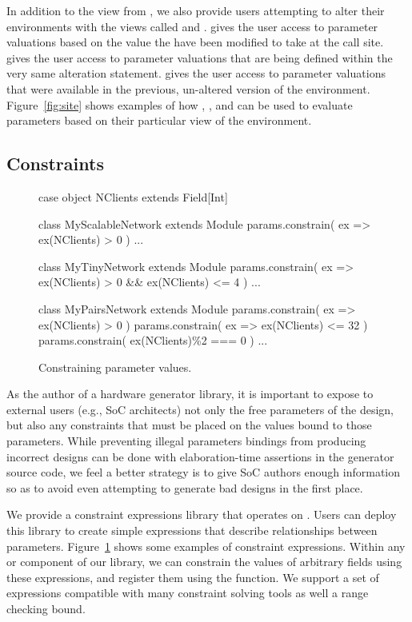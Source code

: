 In addition to the view from , we also provide users attempting to alter their environments with the views called  and .
 gives the user access to parameter valuations based on the value the have been modified to take at the call site.
 gives the user access to parameter valuations that are being defined within the very same alteration statement.
 gives the user access to parameter valuations that were available in the previous, un-altered version of the environment.
Figure~\ref{fig:site} shows examples of how , , and  can be used to evaluate parameters based on their particular view of the environment.

\subsection{Constraints}

\begin{figure}
\centering
\begin{scala}
case object NClients extends Field[Int]

class MyScalableNetwork extends Module {
  params.constrain( ex => ex(NClients) >  0 ) 
  ...
} 

class MyTinyNetwork extends Module {
  params.constrain( ex => ex(NClients) > 0 && ex(NClients) <= 4 )
  ...
} 

class MyPairsNetwork extends Module {
  params.constrain( ex => ex(NClients) > 0 ) 
  params.constrain( ex => ex(NClients) <= 32 )
  params.constrain( ex(NClients)\%2 === 0 )
  ...
} 
\end{scala} 
\caption{Constraining parameter values. }
\label{fig:constraints}
\end{figure}

As the author of a hardware generator library, it is important to expose to external users (e.g., SoC architects)
not only the free parameters of the design, but also any constraints that must be placed on
the values bound to those parameters. 
While preventing illegal parameters bindings from producing incorrect designs can be done with elaboration-time assertions
in the generator source code, we feel a better strategy is to give SoC authors enough information
so as to avoid even attempting to generate bad designs in the first place.

We provide a constraint expressions library that operates on .
Users can deploy this library to create simple expressions that describe relationships between parameters.
Figure~\ref{fig:constraints} shows some examples of constraint expressions.
Within any  or  component of our library, we can constrain the values of arbitrary fields using these expressions,
and register them using the  function.
We support a set of expressions compatible with many constraint solving tools %
as well a range checking bound.

